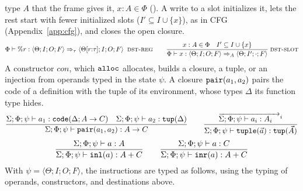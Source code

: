 type $A$ that the frame gives it, $x : A \in \Phi$ (). A
write to a slot initializes it, lets the rest start with fewer initialized
slots ($I' \subseteq I \cup \{x\}$), as in CFG (Appendix~\ref{app:cfg}), and
closes the open closure.
{\small\figdefs
{}
\[
  \Phi \vdash \%r : \langle \Theta; I; O; F \rangle \Rightarrow_\tau \langle \Theta[r{:}\tau]; I; O; F \rangle
  \;\;\textsc{dst-reg}
  \qquad
  \dfrac{x : A \in \Phi \quad I' \subseteq I \cup \{x\}}
        {\Phi \vdash x : \langle \Theta; I; O; F \rangle \Rightarrow_{A} \langle \Theta; I'; \cdot; F \rangle}
  \;\textsc{dst-slot}
\]
}
A constructor $\mathit{con}$, which $\mathtt{alloc}$ allocates, builds a closure, a tuple, or an injection from operands typed in
the state $\psi$. A closure $\mathtt{pair}(a_1, a_2)$ pairs the code of a
definition with the tuple of its environment, whose types $\Delta$ its function
type hides.
{\small\figdefs
{}
\[
  \dfrac{\Sigma; \Phi; \psi \vdash a_1 : \mathtt{code}(\Delta; A \rightarrow C) \quad
         \Sigma; \Phi; \psi \vdash a_2 : \mathtt{tup}(\Delta)}
        {\Sigma; \Phi; \psi \vdash \mathtt{pair}(a_1, a_2) : A \rightarrow C}
  \qquad
  \dfrac{\overrightarrow{\Sigma; \Phi; \psi \vdash a_i : A_i \quad}^{i}}
        {\Sigma; \Phi; \psi \vdash \mathtt{tuple}(\vec{a}) : \mathtt{tup}(\vec{A})}
\]
\[
  \dfrac{\Sigma; \Phi; \psi \vdash a : A}{\Sigma; \Phi; \psi \vdash \mathtt{inl}(a) : A + C}
  \qquad
  \dfrac{\Sigma; \Phi; \psi \vdash a : C}{\Sigma; \Phi; \psi \vdash \mathtt{inr}(a) : A + C}
\]
}
With $\psi = \langle \Theta; I; O; F \rangle$, the instructions are typed as
follows, using the typing of operands, constructors, and destinations above.
